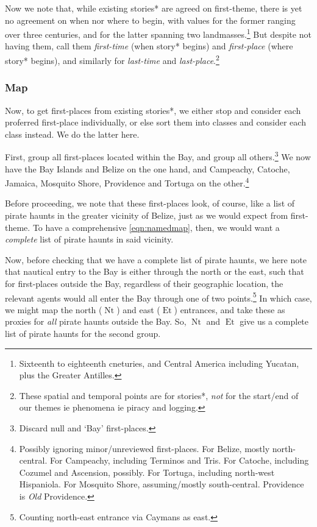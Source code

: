 \documentclass{amsart}
\newcommand{\ment}[1]{\textit{#1}} %
\DeclareMathOperator{\et}{Et} %
\DeclareMathOperator{\nt}{Nt} %
\theoremstyle{definition}
\theoremstyle{remark}
\begin{document}
		Now we note that, while existing stories* are agreed on first-theme, there is yet no agreement on when nor where to begin, with values for the former ranging over three centuries, and for the latter spanning two landmasses.\footnote{Sixteenth to eighteenth cneturies, and Central America including Yucatan, plus the Greater Antilles.} But despite not having them, call them \ment{first-time} (when story* begins) and \ment{first-place} (where story* begins), and similarly for \ment{last-time} and \ment{last-place}.\footnote{These spatial and temporal points are for stories*, \emph{not} for the start/end of our themes ie phenomena ie piracy and logging.}
		\subsubsection{Map}
		\label{sss:map}
			Now, to get first-places from existing stories*, we either stop and consider each proferred first-place individually, or else sort them into classes and consider each class instead. We do the latter here.
		
			First, group all first-places located within the Bay, and group all others.\footnote{Discard null and `Bay' first-places.} We now have the Bay Islands and Belize on the one hand, and Campeachy, Catoche, Jamaica, Mosquito Shore, Providence and Tortuga on the other.\footnote{Possibly ignoring minor/unreviewed first-places. For Belize, mostly north-central. For Campeachy, including Terminos and Tris. For Catoche, including Cozumel and Ascension, possibly. For Tortuga, including north-west Hispaniola. For Mosquito Shore, assuming/mostly south-central. Providence is \emph{Old} Providence.}
		
			Before proceeding, we note that these first-places look, of course, like a list of pirate haunts in the greater vicinity of Belize, just as we would expect from first-theme. To have a comprehensive \ref{eqn:namedmap}, then, we would want a \emph{complete} list of pirate haunts in said vicinity.
		
			Now, before checking that we have a complete list of pirate haunts, we here note that nautical entry to the Bay is either through the north or the east, such that for first-places outside the Bay, regardless of their geographic location, the relevant agents would all enter the Bay through one of two points.\footnote{Counting north-east entrance via Caymans as east.} In which case, we might map the north (\(\nt\)) and east (\(\et\)) entrances, and take these as proxies for \emph{all} pirate haunts outside the Bay. So, \(\nt\) and \(\et\) give us a complete list of pirate haunts for the second group.
		
\end{document}
